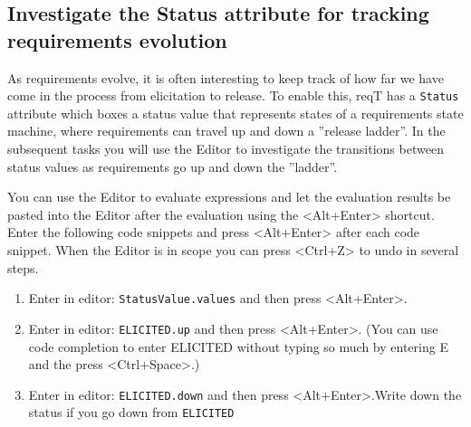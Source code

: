 \documentclass[11pt]{article}
\begin{document}
\subsection{Investigate the Status attribute for tracking requirements evolution}

As requirements evolve, it is often interesting to keep track of how far we have come in the process from elicitation to release. To enable this, reqT has a \verb+Status+ attribute which boxes a status value that  represents states of a requirements state machine, where requirements can travel up and down a  ''release ladder''. In the subsequent tasks you will use the Editor to investigate the transitions between status values as requirements go up and down the ''ladder''.  

\begin{framed}
\noindent You can use the Editor to evaluate expressions and let the evaluation results be pasted into the Editor after the evaluation using the <Alt+Enter> shortcut. Enter the following code snippets and press <Alt+Enter> after each code snippet. When the Editor is in scope you can press <Ctrl+Z> to undo in several steps.
\begin{enumerate}
\item Enter in editor: \verb+StatusValue.values+ and then press <Alt+Enter>.
\item Enter in editor: \verb+ELICITED.up+ and then press <Alt+Enter>. (You can use code completion to enter ELICITED without typing so much by entering E and the press <Ctrl+Space>.)
\item Enter in editor: \verb+ELICITED.down+ and then press <Alt+Enter>.\newline Write down the status if you go down from \verb+ELICITED+\newline\underline{\hspace{10cm}}
\end{enumerate}
\end{framed}
\end{document}
